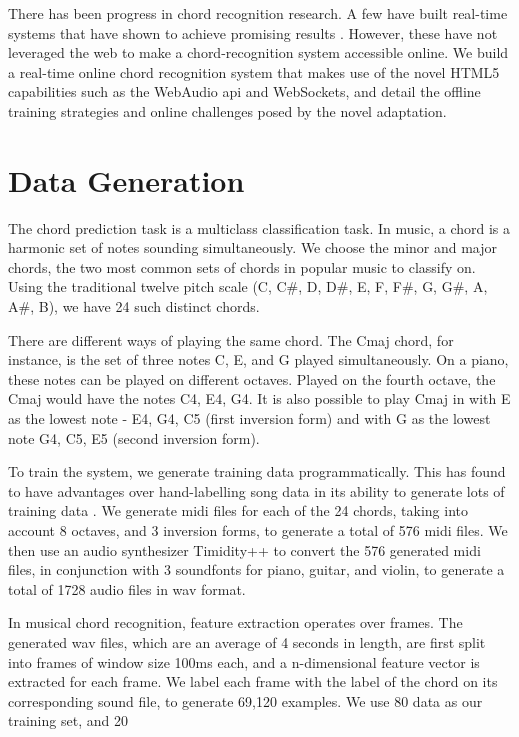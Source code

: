 \documentclass{article}
\begin{document}
There has been progress in chord recognition research. A few have built
real-time systems that have shown to achieve promising results \cite{fujishima,
cho}. However, these have not leveraged the web to make a chord-recognition
system accessible online. We build a real-time online chord recognition system
that makes use of the novel HTML5 capabilities such as the WebAudio api and
WebSockets, and detail the offline training strategies and online challenges
posed by the novel adaptation.

\section{Data Generation}
The chord prediction task is a multiclass classification task. In music, a chord
is a harmonic set of notes sounding simultaneously. We choose the minor and
major chords, the two most common sets of chords in popular music to classify
on. Using the traditional twelve pitch scale (C, C\#, D, D\#, E, F, F\#, G, G\#,
A, A\#, B), we have 24 such distinct chords.

There are different ways of playing the same chord. The Cmaj chord, for
instance, is the set of three notes C, E, and G played simultaneously. On a
piano, these notes can be played on different octaves. Played on the fourth
octave, the Cmaj would have the notes C4, E4, G4. It is also possible to play
Cmaj in with E as the lowest note - E4, G4, C5 (first inversion form) and with G
as the lowest note G4, C5, E5 (second inversion form).

To train the system, we generate training data programmatically. This has found
to have advantages over hand-labelling song data in its ability to generate lots
of training data \cite{lee}. We generate midi files for each of the 24 chords,
taking into account 8 octaves, and 3 inversion forms, to generate a total of 576
midi files. We then use an audio synthesizer Timidity++ to convert the 576
generated midi files, in conjunction with 3 soundfonts for piano, guitar, and
violin, to generate a total of 1728 audio files in wav format.

In musical chord recognition, feature extraction operates over frames. The
generated wav files, which are an average of 4 seconds in length, are first
split into frames of window size 100ms each, and a n-dimensional feature vector
is extracted for each frame. We label each frame with the label of the chord on
its corresponding sound file, to generate 69,120 examples. We use 80%
data as our training set, and 20%
\end{document}
